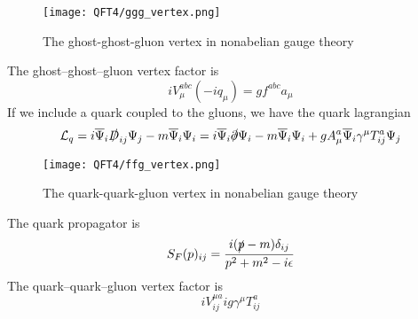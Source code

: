 \documentclass[cyan]{elegantnote}
\begin{document}
\begin{figure}[!h]
	\centering
	\texttt{[image: QFT4/ggg\_vertex.png]}
	\caption{The ghost-ghost-gluon vertex in nonabelian gauge theory}
\end{figure}

\noindent
The ghost–ghost–gluon vertex factor is
\[iV^{abc}_{\mu}(-iq_{\mu}) = gf^{abc}a_{\mu}\]
If we include a quark coupled to the gluons, we have the quark lagrangian
\[\mathcal{L}_{q} = i\overline{\Psi}_{i}\slashed{D}_{ij}\Psi_{j} - m\overline{\Psi}_{i}\Psi_{i} = i\overline{\Psi}_{i}\slashed{\partial}\Psi_{i} - m\overline{\Psi}_{i}\Psi_{i} + gA^a_{\mu}\overline{\Psi}_{i} \gamma^{\mu} T^a_{ij} \Psi_j \]

\begin{figure}[!h]
	\centering
	\texttt{[image: QFT4/ffg\_vertex.png]}
	\caption{The quark-quark-gluon vertex in nonabelian gauge theory}
\end{figure}

\noindent
The quark propagator is
\[S_F(p)_{ij} = \frac{i(\slashed{p}-m)\delta_{ij}}{p^2+m^2 - i\epsilon}\]
The quark–quark–gluon vertex factor is
\[iV^{\mu a}_{ij} ig\gamma^{\mu}T^a_{ij}\]
\end{document}
